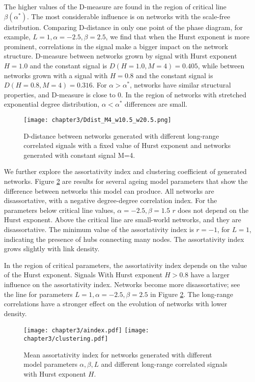 The higher values of the D-measure are found in the region of critical line $\beta(\alpha^{*})$. The most considerable influence is on networks with the scale-free distribution. Comparing D-distance in only one point of the phase diagram, for example, $L=1, \alpha = -2.5, \beta = 2.5$, we find that when the Hurst exponent is more prominent, correlations in the signal make a bigger impact on the network structure. D-measure between networks grown by signal with Hurst exponent $H=1.0$ and the constant signal is $D(H=1.0, M=4) = 0.405$, while between networks grown with a signal with $H=0.8$ and the constant signal is $D(H=0.8, M=4) = 0.316$. For $\alpha>\alpha^{*}$, networks have similar structural properties, and D-measure is close to 0. In the region of networks with stretched exponential degree distribution, $\alpha<\alpha^{*}$  differences are small. 

\begin{figure}[H]
	\centering
	\texttt{[image: chapter3/Ddist\_M4\_w10.5\_w20.5.png]}
	\caption[D-distance for networks generated with monofractal signals. ]{D-distance between networks generated with different long-range correlated signals with a fixed value of Hurst exponent and networks generated with constant signal M=4.}
	\label{fig:Ddist_m}
\end{figure}


We further explore the assortativity index and clustering coefficient of generated networks. Figure \ref{fig:aindex} are results for several ageing model parameters that show the difference between networks this model can produce. All networks are disassortative, with a negative degree-degree correlation index. For the parameters below critical line values, $\alpha=-2.5, \beta=1.5$ $r$ does not depend on the Hurst exponent. Above the critical line are small-world networks, and they are disassortative. The minimum value of the assortativity index is $r =-1$, for $L=1$, indicating the presence of hubs connecting many nodes. The assortativity index grows slightly with link density. 

In the region of critical parameters, the assortativity index depends on the value of the Hurst exponent. Signals With Hurst exponent $H>0.8$ have a larger influence on the assortativity index. Networks become more disassortative; see the line for parameters $L=1, \alpha=-2.5, \beta=2.5$ in Figure \ref{fig:aindex}. The long-range correlations have a stronger effect on the evolution of networks with lower density. 

\begin{figure}[h!]
	\centering
	\texttt{[image: chapter3/aindex.pdf]}
	\texttt{[image: chapter3/clustering.pdf]}
	\caption[Assortativity index and mean clustering coefficient.]{Mean assortativity index for networks generated  with different model parameters $\alpha, \beta, L$ and different long-range correlated signals with Hurst exponent $H$.}
	\label{fig:aindex}
\end{figure} 

